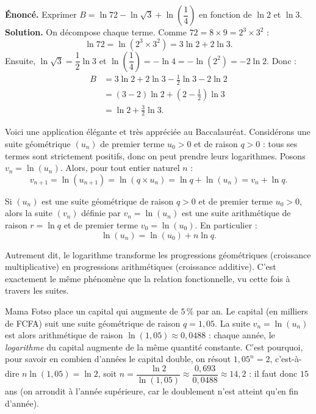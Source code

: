 \documentclass[11pt]{article}
\newcommand{\cle}[1]{{\popxbold\color{popdark}#1}}
\newcounter{popsec}
\newcounter{popsub}
\newcommand{\courssub}[1]{%
  \stepcounter{popsub}%
  \par\vspace{9pt}\noindent{\popxbold\fontsize{11.5}{13}\selectfont\color{popink}{\color{poporange}\thepopsec.\thepopsub}\hspace{6pt}#1}\par\nopagebreak\vspace{4pt}
}
\begin{document}
\begin{exoresolu}
\textbf{Énoncé.} Exprimer $B = \ln 72 - \ln\sqrt{3} + \ln\left(\dfrac{1}{4}\right)$ en fonction de $\ln 2$ et $\ln 3$.
\tcblower
\textbf{Solution.} On décompose chaque terme. Comme $72 = 8 \times 9 = 2^3 \times 3^2$ :
\[ \ln 72 = \ln(2^3 \times 3^2) = 3\ln 2 + 2\ln 3. \]
Ensuite, $\ln\sqrt{3} = \dfrac{1}{2}\ln 3$ et $\ln\left(\dfrac{1}{4}\right) = -\ln 4 = -\ln(2^2) = -2\ln 2$. Donc :
\begin{align*}
B &= 3\ln 2 + 2\ln 3 - \frac{1}{2}\ln 3 - 2\ln 2 \\
&= (3-2)\ln 2 + \left(2 - \frac{1}{2}\right)\ln 3 \\
&= \ln 2 + \frac{3}{2}\ln 3.
\end{align*}
\end{exoresolu}

\courssub{Lien avec les suites géométriques}

Voici une application élégante et très appréciée au Baccalauréat. Considérons une suite géométrique $(u_n)$ de premier terme $u_0 > 0$ et de raison $q > 0$ : tous ses termes sont strictement positifs, donc on peut prendre leurs logarithmes. Posons $v_n = \ln(u_n)$. Alors, pour tout entier naturel $n$ :
\[ v_{n+1} = \ln(u_{n+1}) = \ln(q \times u_n) = \ln q + \ln(u_n) = v_n + \ln q. \]

\begin{propriete}
Si $(u_n)$ est une suite géométrique de raison $q > 0$ et de premier terme $u_0 > 0$, alors la suite $(v_n)$ définie par $v_n = \ln(u_n)$ est une suite \cle{arithmétique} de raison $r = \ln q$ et de premier terme $v_0 = \ln(u_0)$. En particulier :
\[ \ln(u_n) = \ln(u_0) + n\ln q. \]
\end{propriete}

Autrement dit, le logarithme transforme les progressions géométriques (croissance multiplicative) en progressions arithmétiques (croissance additive). C'est exactement le même phénomène que la relation fonctionnelle, vu cette fois à travers les suites.

\begin{exemplebox}
Mama Fotso place un capital qui augmente de $5\,\%$ par an. Le capital (en milliers de FCFA) suit une suite géométrique de raison $q = 1{,}05$. La suite $v_n = \ln(u_n)$ est alors arithmétique de raison $\ln(1{,}05) \approx 0{,}0488$ : chaque année, le \emph{logarithme} du capital augmente de la même quantité constante. C'est pourquoi, pour savoir en combien d'années le capital double, on résout $1{,}05^n = 2$, c'est-à-dire $n\ln(1{,}05) = \ln 2$, soit $n = \dfrac{\ln 2}{\ln(1{,}05)} \approx \dfrac{0{,}693}{0{,}0488} \approx 14{,}2$ : il faut donc $15$ ans (on arrondit à l'année supérieure, car le doublement n'est atteint qu'en fin d'année).
\end{exemplebox}
\end{document}
